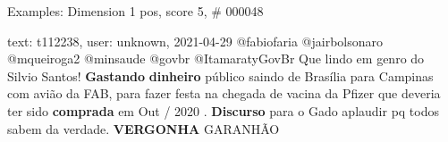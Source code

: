 \begin{frame}{Examples: Dimension 1 pos, score 5, \# 000048}
\footnotesize
\begin{exampleblock}{text: t112238, user: unknown, 2021-04-29}
@fabiofaria @jairbolsonaro @mqueiroga2 @minsaude @govbr @ItamaratyGovBr Que 
lindo em genro do Silvio Santos! \textbf{Gastando} \textbf{dinheiro} público 
saindo de Brasília para Campinas com avião da FAB, para fazer festa na chegada 
de vacina da Pfizer que deveria ter sido \textbf{comprada} em Out / 2020 . 
\textbf{Discurso} para o Gado aplaudir pq todos sabem da verdade. 
\textbf{VERGONHA} GARANHÃO 
\end{exampleblock}
\end{frame}

